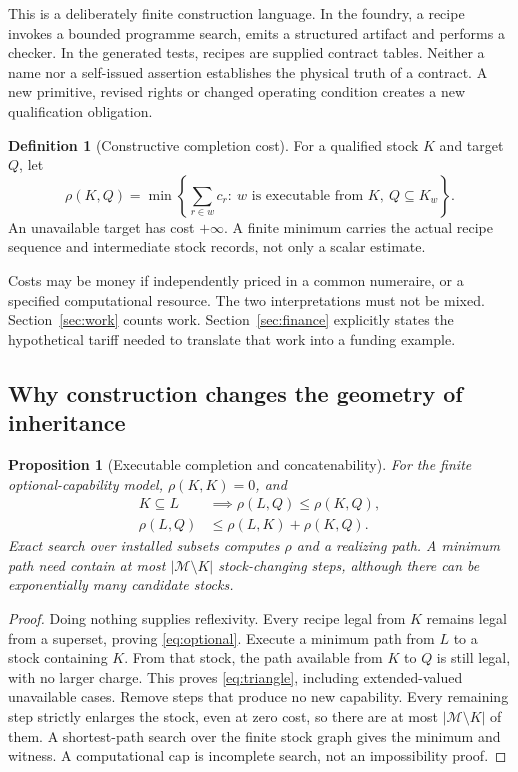 \documentclass[11pt,letterpaper]{article}
\newcommand{\M}{\mathcal M}\newcommand{\A}{\mathcal A}\newcommand{\B}{\mathcal B}
\newtheorem{proposition}[theorem]{Proposition}
\theoremstyle{definition}\newtheorem{definition}[theorem]{Definition}
\theoremstyle{remark}\newtheorem{remark}[theorem]{Remark}
\begin{document}
This is a deliberately finite construction language. In the foundry, a recipe invokes a bounded programme search, emits a structured artifact and performs a checker. In the generated tests, recipes are supplied contract tables. Neither a name nor a self-issued assertion establishes the physical truth of a contract. A new primitive, revised rights or changed operating condition creates a new qualification obligation.

\begin{definition}[Constructive completion cost]
For a qualified stock $K$ and target $Q$, let
\begin{equation}
 \rho(K,Q)=\min\left\{\sum_{r\in w}c_r:\ w\text{ is executable from }K,\ Q\subseteq K_w\right\}.
 \label{eq:rho}
\end{equation}
An unavailable target has cost $+\infty$. A finite minimum carries the actual recipe sequence and intermediate stock records, not only a scalar estimate.
\end{definition}

Costs may be money if independently priced in a common numeraire, or a specified computational resource. The two interpretations must not be mixed. Section~\ref{sec:work} counts work. Section~\ref{sec:finance} explicitly states the hypothetical tariff needed to translate that work into a funding example.

\subsection{Why construction changes the geometry of inheritance}
\begin{proposition}[Executable completion and concatenability]
\label{prop:completion}
For the finite optional-capability model, $\rho(K,K)=0$, and
\begin{align}
 K\subseteq L&\implies\rho(L,Q)\le\rho(K,Q),\label{eq:optional}\\
 \rho(L,Q)&\le\rho(L,K)+\rho(K,Q).\label{eq:triangle}
\end{align}
Exact search over installed subsets computes $\rho$ and a realizing path. A minimum path need contain at most $|\M\setminus K|$ stock-changing steps, although there can be exponentially many candidate stocks.
\end{proposition}
\begin{proof}
Doing nothing supplies reflexivity. Every recipe legal from $K$ remains legal from a superset, proving \eqref{eq:optional}. Execute a minimum path from $L$ to a stock containing $K$. From that stock, the path available from $K$ to $Q$ is still legal, with no larger charge. This proves \eqref{eq:triangle}, including extended-valued unavailable cases. Remove steps that produce no new capability. Every remaining step strictly enlarges the stock, even at zero cost, so there are at most $|\M\setminus K|$ of them. A shortest-path search over the finite stock graph gives the minimum and witness. A computational cap is incomplete search, not an impossibility proof.
\end{proof}
\end{document}
